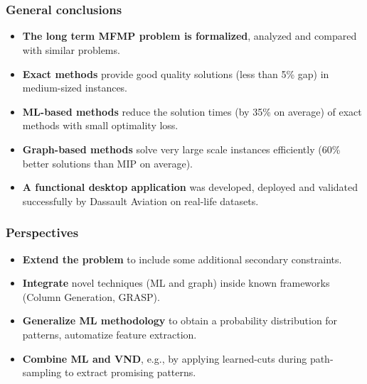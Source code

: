 \section[Conclusions]{\conclusiontitle}

\begin{frame}
\frametitle{\textbf{General conclusions}}
    \begin{itemize}[<+->]
    \item \textbf{The long term MFMP problem is formalized}, 
      analyzed and compared with similar problems.
    \item \textbf{Exact methods}
      provide good quality solutions (less than 5\% gap) in medium-sized instances.
    \item \textbf{ML-based methods}
      reduce the solution times (by 35\% on average) of exact methods with small optimality loss.
    \item \textbf{Graph-based methods}
      solve very large scale instances efficiently (60\% better solutions than MIP on average).
    \item \textbf{A functional desktop application}
       was developed, deployed and validated successfully by Dassault Aviation on real-life datasets.
    \end{itemize}
\end{frame}




\begin{frame}
\frametitle{\textbf{Perspectives}}
    \begin{itemize}[<+->]
      \item \textbf{Extend the problem} to include some additional secondary constraints.        
      \item \textbf{Integrate} novel techniques (ML and graph) inside known frameworks (Column Generation, GRASP).
      \item \textbf{Generalize ML methodology}
        to obtain a probability distribution for patterns, automatize feature extraction.
      \item \textbf{Combine ML and VND},
        e.g., by applying learned-cuts during path-sampling to extract promising patterns.
    \end{itemize}
\end{frame}

